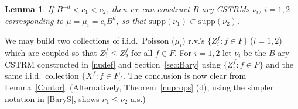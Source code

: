 \documentclass[12pt]{article}
\makeatletter
\renewenvironment{proof}[1][\proofname]{%
\par\pushQED{\qed}\normalfont%
\topsep6\p@\@plus6\p@\relax
\trivlist\item[\hskip\labelsep\bfseries#1\@addpunct{.}]%
\ignorespaces
}{%
\popQED\endtrivlist\@endpefalse
}
\numberwithin{theorem}{section}
\newtheorem{lemma}[theorem]{Lemma}
\theoremstyle{def}
\numberwithin{equation}{section}
\newcommand{\N}{\mathbb{N}}
\newcommand{\supp}{\mathrm{supp}}
\makeatother
\begin{document}
\begin{lemma}\label{monotone}
If $B^{-d}<c_1<c_2$, then we can construct $B$-ary CSTRMs $\nu_i$, $i=1,2$ corresponding to $\mu=\mu_i=c_iB^d$, so that $\supp(\nu_1)\subset \supp(\nu_2)$.
\end{lemma}
\begin{proof} We may build two collections of i.i.d.\ Poisson ($\mu_i$) r.v.'s $\{Z^f_i:f \in F\}$ ($i=1,2$) which are coupled so that $Z^f_1\le Z^f_2$ for all $f\in F$.  For $i=1,2$ let $\nu_i$ be the $B$-ary CSTRM constructed in \eqref{nudef} and Section~\ref{sec:Bary} using $\{Z^f_i:f\in F\}$ and the same i.i.d.\ collection $\{X^f:f\in F\}$.  
The conclusion is now clear from Lemma~\ref{Cantor}. (Alternatively, Theorem~\ref{nuprops} (d), using the simpler notation in \eqref{BaryS}, shows $\nu_1\le \nu_2$ a.s.)
\end{proof} 
\end{document}
